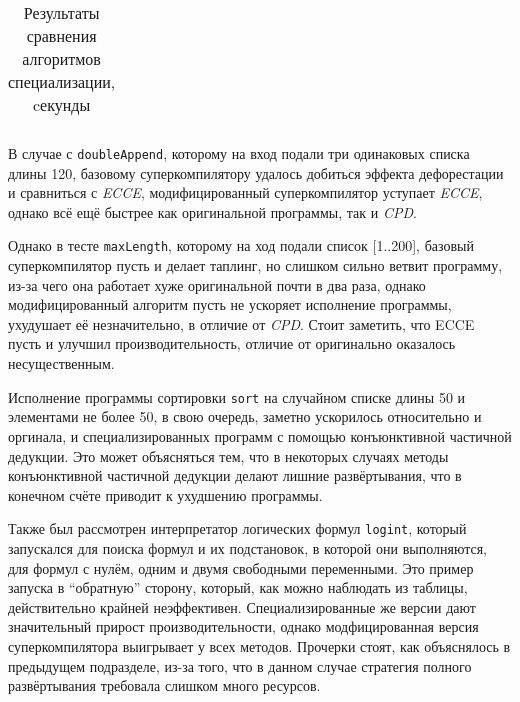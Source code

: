\begin{table}[h!]
\begin{tabular}{|c|c|c|c|c|c|}
\end{tabular}
\caption{Результаты сравнения алгоритмов специализации, cекунды}
\label{fig:totalResult}
\end{table}

В случае с \lstinline{doubleAppend}, которому на вход подали три одинаковых списка длины 120,
базовому суперкомпилятору удалось
добиться эффекта дефорестации и сравниться с {\it ECCE}, модифицированный суперкомпилятор
уступает {\it ECCE}, однако всё ещё быстрее как оригинальной программы, так и {\it CPD}.

Однако в тесте \lstinline{maxLength}, которому на ход подали список [1..200], базовый суперкомпилятор пусть и делает
таплинг, но слишком сильно ветвит программу, из-за чего она работает хуже оригинальной
почти в два раза, однако модифицированный алгоритм пусть не ускоряет исполнение программы,
ухудушает её незначительно, в отличие от {\it CPD}. Стоит заметить, что ECCE пусть и
улучшил производительность, отличие от оригинально оказалось несущественным.

Исполнение программы сортировки \lstinline{sort} на случайном списке длины 50 и элементами
не более 50, в свою очередь, заметно ускорилось относительно и оргинала, и специализированных
программ с помощью конъюнктивной частичной дедукции. Это может объясняться тем, что в некоторых
случаях методы конъюнктивной частичной дедукции делают лишние развёртывания, что в конечном
счёте приводит к ухудшению программы.

Также был рассмотрен интерпретатор логических формул \lstinline{logint}, который
запускался для поиска формул и их подстановок, в которой они выполняются, для
формул с нулём, одним и двумя свободными переменными. Это пример запуска в ``обратную''
сторону, который, как можно наблюдать из таблицы, действительно крайней неэффективен.
Специализированные же версии дают значительный прирост производительности, однако
модфицированная версия суперкомпилятора выигрывает у всех методов. Прочерки стоят,
как объяснялось в предыдущем подразделе, из-за того, что в данном случае стратегия
полного развёртывания требовала слишком много ресурсов.
